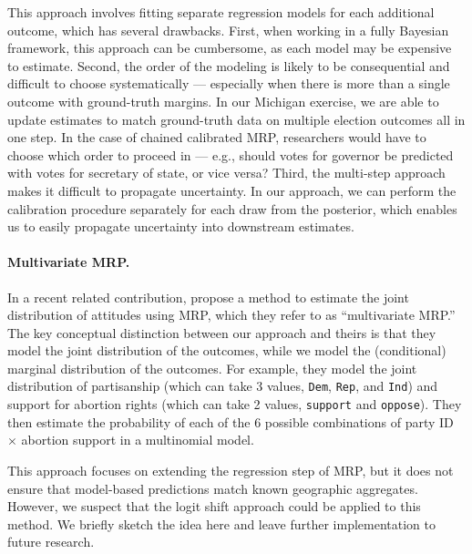  
This approach involves fitting separate regression models for each additional outcome, which has several drawbacks.
First, when working in a fully Bayesian framework, this approach can be cumbersome, as each model may be expensive to estimate.
Second, the order of the modeling is likely to be consequential and difficult to choose systematically --- especially when there is more than a single outcome with ground-truth margins.
In our Michigan exercise, we are able to update estimates to match ground-truth data on multiple election outcomes all in one step. 
In the case of chained calibrated MRP, researchers would have to choose which order to proceed in --- e.g., should votes for governor be predicted with votes for secretary of state, or vice versa?
Third, the multi-step approach makes it difficult to propagate uncertainty.
In our approach, we can perform the calibration procedure separately for each draw from the posterior, which enables us to easily propagate uncertainty into downstream estimates.


\paragraph{Multivariate MRP.}
In a recent related contribution, \citet{Goplerud2025} propose a method to estimate the joint distribution of attitudes using MRP, which they refer to as ``multivariate MRP.''
The key conceptual distinction between our approach and theirs is that they model the joint distribution of the outcomes, while we model the (conditional) marginal distribution of the outcomes.
For example, they model the joint distribution of partisanship (which can take 3 values, \texttt{Dem}, \texttt{Rep}, and \texttt{Ind}) and support for abortion rights (which can take 2 values, \texttt{support} and \texttt{oppose}). 
They then estimate the probability of each of the 6 possible combinations of party ID $\times$ abortion support in a multinomial model. 

This approach focuses on extending the regression step of MRP, but it does not  ensure that model-based predictions match known geographic aggregates. 
However, we suspect that the logit shift approach could be applied to this method. 
We briefly sketch the idea here and leave further implementation to future research.

